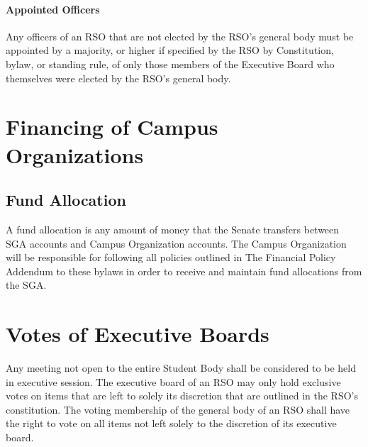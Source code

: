 \documentclass[12pt]{scrreprt}
\begin{document}
\paragraph{Appointed Officers}
Any officers of an RSO that are not elected by the RSO’s general body
must be appointed by a majority, or higher if specified by the RSO by
Constitution, bylaw, or standing rule, of only those members of the
Executive Board who themselves were elected by the RSO’s general body.

\section{Financing of Campus Organizations}

\subsection{Fund Allocation}
A fund allocation is any amount of money that the Senate transfers between SGA accounts and Campus Organization accounts. The Campus Organization will be responsible for following all policies outlined in The Financial Policy Addendum to these bylaws in order to receive and maintain fund allocations from the SGA.

\section{Votes of Executive Boards}
Any meeting not open to the entire Student Body shall be considered to be held 
in executive session. The executive board of an RSO may only hold exclusive votes on items that are left to solely its discretion that are outlined in the RSO’s constitution. The voting membership of the general body of an RSO shall have the right to vote on all items not left solely to the discretion of its executive board.
\end{document}
